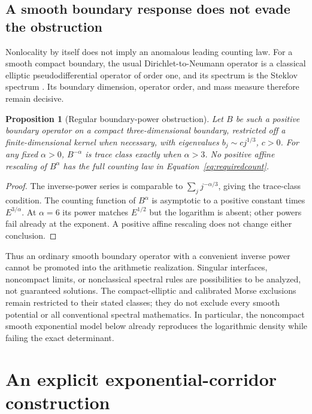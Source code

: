 \documentclass[11pt,letterpaper]{article}
\numberwithin{equation}{section}
\newtheorem{proposition}[theorem]{Proposition}
\theoremstyle{definition}
\theoremstyle{remark}
\begin{document}
\subsection{A smooth boundary response does not evade the obstruction}
\label{subsec:boundaryweyl}
Nonlocality by itself does not imply an anomalous leading counting law. For a smooth compact boundary, the usual Dirichlet-to-Neumann operator is a classical elliptic pseudodifferential operator of order one, and its spectrum is the Steklov spectrum \cite{steklov}. Its boundary dimension, operator order, and mass measure therefore remain decisive.

\begin{proposition}[Regular boundary-power obstruction]
\label{prop:boundarypower}
Let $B$ be such a positive boundary operator on a compact three-dimensional boundary, restricted off a finite-dimensional kernel when necessary, with eigenvalues $b_j\sim c j^{1/3}$, $c>0$. For any fixed $\alpha>0$, $B^{-\alpha}$ is trace class exactly when $\alpha>3$. No positive affine rescaling of $B^\alpha$ has the full counting law in Equation~\eqref{eq:requiredcount}.
\end{proposition}
\begin{proof}
The inverse-power series is comparable to $\sum_j j^{-\alpha/3}$, giving the trace-class condition. The counting function of $B^\alpha$ is asymptotic to a positive constant times $E^{3/\alpha}$. At $\alpha=6$ its power matches $E^{1/2}$ but the logarithm is absent; other powers fail already at the exponent. A positive affine rescaling does not change either conclusion.
\end{proof}

Thus an ordinary smooth boundary operator with a convenient inverse power cannot be promoted into the arithmetic realization. Singular interfaces, noncompact limits, or nonclassical spectral rules are possibilities to be analyzed, not guaranteed solutions. The compact-elliptic and calibrated Morse exclusions remain restricted to their stated classes; they do not exclude every smooth potential or all conventional spectral mathematics. In particular, the noncompact smooth exponential model below already reproduces the logarithmic density while failing the exact determinant.

\section{An explicit exponential-corridor construction}
\label{sec:exponential}
\end{document}
